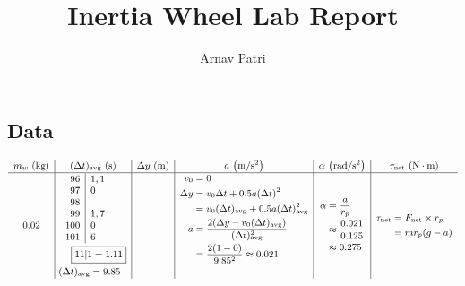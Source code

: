 \documentclass[12pt, A4]{article}
\title{Inertia Wheel Lab Report}
\author{Arnav Patri}
\newcommand{\avg}[1]{#1_{\mathrm{avg}}}
\newcommand{\net}[1]{#1_{\mathrm{net}}}
\begin{document}
	\maketitle
		\subsection*{Data}
			\[\small\begin{array}{c|c|c|c|c|c}
				m_w\text{ (kg)} & \avg{(\Delta t)}\text{ (s)} & \Delta y\text{ (m)} & a \text{ }\mathrm{\left(m/s^2\right)} & \alpha \text{ } \mathrm{\left(rad/s^2\right)} & \net{\tau} \text{ } \mathrm{(N\cdot m)} \\\hline
				0.02 & 
					\begin{aligned}
						&\begin{array}{r|l}
							96 & 1, 1\\
							97 & 0 \\
							98 \\
							99 & 1, 7 \\
							100 & 0 \\
							101 & 6
							\end{array} \\
						&\hspace{3.7mm}\boxed{11|1 = 1.11} \\
						&\hspace{-0.5mm}\avg{(\Delta t)} = 9.85
					\end{aligned} &
					\multirow{30}{*}{1} &
					\begin{aligned}
						v_0 &= 0 \\
						\Delta y &= v_0\Delta t + 0.5a(\Delta t)^2 \\
						 &= v_0\avg{(\Delta t)} + 0.5a\avg{(\Delta t)}^2 \\
						 a &= \frac{2(\Delta y - v_0\avg{(\Delta t)})}{\avg{(\Delta t)}^2} \\
						 	&= \frac{2(1 - 0)}{9.85^2} \approx 0.021 \\
						 	\\[0.1mm]
					\end{aligned} &
					\begin{aligned}
						\alpha &= \frac{a}{r_p} \\
							&\approx \frac{0.021}{0.125} \\
							&\approx 0.275
					\end{aligned} &
					\begin{aligned}
						\net{\tau} &= \net{F}\times r_p \\
							&= mr_p(g - a) \\

\end{aligned}
\end{array}\]
\end{document}
